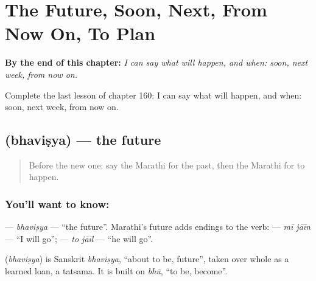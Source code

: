 
\chapter{The Future, Soon, Next, From Now On, To Plan}
\label{ch:mr-the-future-soon-next-from-now-on-to-plan}

\begin{chapteropening}
\textbf{By the end of this chapter:} \emph{I can say what will happen, and when: soon, next week, from now on.}

Complete the last lesson of chapter 160: I can say what will happen, and when: soon, next week, from now on.
\end{chapteropening}

\section[\texorpdfstring{\mr{भविष्य} (bhaviṣya)}{भविष्य (bhaviṣya)}]{ (bhaviṣya) — the future}

\label{lesson:MR-C160-bhavishya}



\begin{quote}
Before the new one: say the Marathi for the past, then the Marathi for to happen.
\end{quote}

\subsection*{You'll want to know: }
\textbf{} — \emph{bhaviṣya} — \textquotedblleft{}the future\textquotedblright{}. Marathi's future adds endings to the verb: \textbf{ } — \emph{mī jāīn} — \textquotedblleft{}I will go\textquotedblright{}; \textbf{ } — \emph{to jāīl} — \textquotedblleft{}he will go\textquotedblright{}.

\begin{cousinweb}
\textbf{} (\emph{bhaviṣya}) is Sanskrit \emph{bhaviṣya}, \textquotedblleft{}about to be, future\textquotedblright{}, taken over whole as a learned loan, a tatsama. It is built on \emph{bhū}, \textquotedblleft{}to be, become\textquotedblright{}.
\end{cousinweb}

